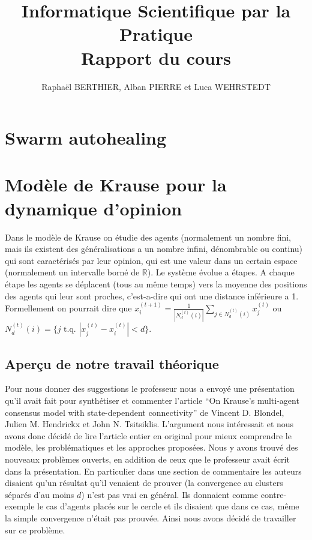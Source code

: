 \documentclass[a4paper,10pt]{article}
\title{Informatique Scientifique par la Pratique\\Rapport du cours}
\author{Raphaël BERTHIER, Alban PIERRE et Luca WEHRSTEDT}
\begin{document}
\maketitle

\section{Swarm autohealing}

\section{Modèle de Krause pour la dynamique d'opinion}

Dans le modèle de Krause on étudie des agents (normalement un nombre fini, mais ils existent des généralisations a un nombre infini, dénombrable ou continu) qui sont caractérisés par leur opinion, qui est une valeur dans un certain espace (normalement un intervalle borné de $\mathbb{R}$). Le système évolue a étapes. A chaque étape les agents se déplacent (tous au même temps) vers la moyenne des positions des agents qui leur sont proches, c'est-a-dire qui ont une distance inférieure a 1. Formellement on pourrait dire que $x_i^{(t+1)} = \frac{1}{|N_d^{(t)}(i)|} \sum_{j \in N_d^{(t)}(i)} x_j^{(t)}$ ou $N_d^{(t)}(i) = \{j \text{ t.q. } |x_j^{(t)} - x_i^{(t)}| < d\}$.

\subsection{Aperçu de notre travail théorique}

Pour nous donner des suggestions le professeur nous a envoyé une présenta\-tion qu'il avait fait pour synthétiser et commenter l'article ``On Krause’s multi-agent consensus model with state-dependent connectivity'' de Vincent D. Blondel, Julien M. Hendrickx et John N. Tsitsiklis. L'argument nous intéressait et nous avons donc décidé de lire l'article entier en original pour mieux comprendre le modèle, les problématiques et les approches proposées. Nous y avons trouvé des nouveaux problèmes ouverts, en addition de ceux que le professeur avait écrit dans la présentation. En particulier dans une section de commentaire les auteurs disaient qu'un résultat qu'il venaient de prouver (la convergence au clusters séparés d'au moins $d$) n'est pas vrai en général. Ils donnaient comme contre-exemple le cas d'agents placés sur le cercle et ils disaient que dans ce cas, même la simple convergence n’était pas prouvée. Ainsi nous avons décidé de travailler sur ce problème.
\end{document}

